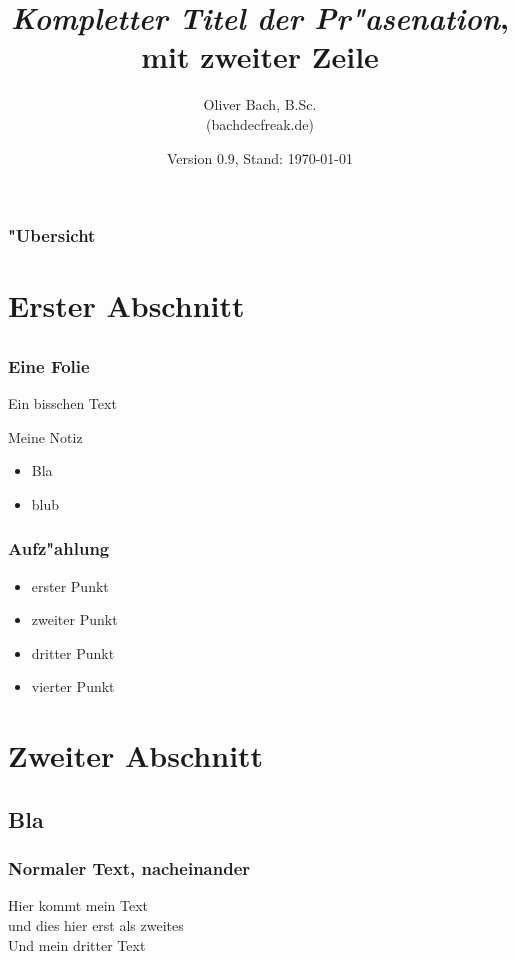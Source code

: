 \documentclass{beamer}
\title[Kurztitle f"ur Fu"sleiste \hspace{3.5cm}  \insertframenumber]
 	{\emph{Kompletter Titel der Pr"asenation}, \\
		\small mit zweiter Zeile}
\author[Oliver Bach]{Oliver Bach, B.Sc. \\ (bach\MVAt{}decfreak.de)}
\date{Version 0.9, Stand: \today}
\begin{document}
 
 \begin{frame}
  \titlepage   		%
  
 \end{frame}
\begin{frame}
 \frametitle{"Ubersicht}
 \tableofcontents
\end{frame}
\section{Erster Abschnitt}
 \subsection{}
\begin{frame}
 \frametitle{Eine Folie}

	Ein bisschen Text
\end{frame}

\note
{
Meine Notiz
\begin{itemize}
	\item Bla
	\item blub
\end{itemize}
}
\begin{frame}
 \frametitle{Aufz"ahlung}

 \begin{itemize}[<+->]
 	\item erster Punkt
	\item zweiter Punkt
	\item dritter Punkt
	\item<2> vierter Punkt
 \end{itemize}

\end{frame}
\section{Zweiter Abschnitt}
 \subsection{Bla}
\begin{frame}
 \frametitle{Normaler Text, nacheinander}
 Hier kommt mein Text\\
 \pause
 und dies hier erst als zweites \\
 \pause
 Und mein dritter Text
\end{frame}
\end{document}

